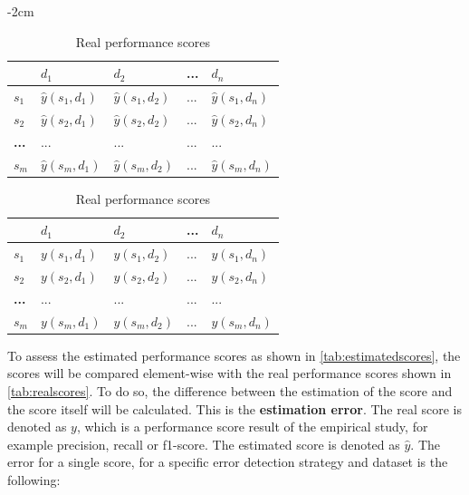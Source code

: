  \begin{table}[h]
	\centering
	\addtolength{\leftskip} {-2cm}
	\addtolength{\rightskip}{-2cm}
	\captionsetup[subtable]{position = below}
	\captionsetup[table]{position=top}
	\caption{$m \times n$ (strategies $\times$ datasets) matrix of scores}
		\begin{subtable}{0.5\linewidth}
		\centering
		\begin{tabular}{|l|l|l|l|l|}
			\hline
			               & \textbf{$d_1$}      & \textbf{$d_2$}      & \textbf{...} & \textbf{$d_n$}      \\ \hline
			\textbf{$s_1$} & $\hat{y}(s_1, d_1)$ & $\hat{y}(s_1, d_2)$ & ...          & $\hat{y}(s_1, d_n)$ \\ \hline
			\textbf{$s_2$} & $\hat{y}(s_2, d_1)$ & $\hat{y}(s_2, d_2)$ & ...          & $\hat{y}(s_2, d_n)$ \\ \hline
			\textbf{...}   & ...                 & ...                 & ...          & ...                 \\ \hline
			\textbf{$s_m$} & $\hat{y}(s_m, d_1)$ & $\hat{y}(s_m, d_2)$ & ...          & $\hat{y}(s_m, d_n)$ \\ \hline
		\end{tabular}
		\caption{Estimated performance scores}
		\label{tab:estimatedscores}
	\end{subtable}
	\hspace*{4em}
	\begin{subtable}{0.5\linewidth}
		\centering
		\begin{tabular}{|l|l|l|l|l|}
			\hline
			               & \textbf{$d_1$} & \textbf{$d_2$} & \textbf{...} & \textbf{$d_n$} \\ \hline
			\textbf{$s_1$} & $y(s_1, d_1)$  & $y(s_1, d_2)$  & ...          & $y(s_1, d_n)$  \\ \hline
			\textbf{$s_2$} & $y(s_2, d_1)$  & $y(s_2, d_2)$  & ...          & $y(s_2, d_n)$  \\ \hline
			\textbf{...}   & ...            & ...            & ...          & ...            \\ \hline
			\textbf{$s_m$} & $y(s_m, d_1)$  & $y(s_m, d_2)$  & ...          & $y(s_m, d_n)$  \\ \hline
		\end{tabular}
		\caption{Real performance scores}
		\label{tab:realscores}
	\end{subtable}%
\end{table}
       

To assess the estimated performance scores as shown in \autoref{tab:estimatedscores}, the scores will be compared element-wise with the real performance scores shown in \autoref{tab:realscores}. To do so, the difference between the estimation of the score and the score itself will be calculated. This is the \textbf{estimation error}. 
The real score is denoted as $y$, which is a performance score result of the empirical study, for example precision, recall or f1-score. The estimated score is denoted as $\hat{y}$. The error for a single score, for a specific error detection strategy and dataset is the following:


